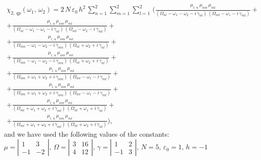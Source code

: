 \documentclass[12pt,twoside,a4paper]{article}
\numberwithin{equation}{subsection}
\numberwithin{figure}{subsection}
\begin{document}
\begin{multline} \label{eq:fht_qp2}
  \chi_{2, \,qp}({\omega_{1}}, \,{\omega_{2}}) = 
     2\,N\,\varepsilon_{0}\,h^{2}\,\sum_{n=1}^{2}\sum_{m=1}^{2}\sum_{l=1}^{2}\,
  ( 
      \frac {{\mu_{l,\,n}}\,{\mu_{nm}}\,{\mu_{ml}}}
      {({\Omega_{nl}} - \omega_1 - \omega_2 - i\,{\gamma_{nl}})\,({\Omega_{ml}} - \omega_1 - i\,{\gamma_{ml}})}
+\\ + \frac   {{\mu_{l, \,n}}\,{\mu_{nm}}\,{\mu_{ml}}}
      {({\Omega_{nl}} - \omega_1 - \omega_1 - i\,{\gamma_{nl}})\,({\Omega_{ml}} - \omega_2 - i\,{\gamma_{ml}})}
+\\ + \frac   {{\mu_{l, \,n}}\,{\mu_{nm}}\,{\mu_{ml}}}
      {({\Omega_{mn}} - \omega_1 - \omega_2 - i\,{\gamma_{mn}})\,({\Omega_{nl}} + \omega_2 + i\,{\gamma_{nl}})}
+\\ + \frac{{\mu_{l, \,n }}\,{\mu_{nm}}\,{\mu_{ml}}} 
      {({\Omega_{mn}} - \omega_1 - \omega_2 - i\,{\gamma_{mn}})\,({\Omega_{nl}} + \omega_2 + i\,{\gamma_{nl}})} 
+\\ + \frac   {{\mu_{l, \,n}}\,{\mu_{nm}}\,{\mu_{ml}}}
      {({\Omega_{nm}} + \omega_1 + \omega_2 + i\,{\gamma_{nm}})\,({\Omega_{ml}} - \omega_1 - i\,{\gamma_{ml}})}
+\\ + \frac {{\mu_{l, \,n}}\,{\mu_{ nm}}\,{\mu_{ml}}}
      {({\Omega_{nm}} + \omega_1 + \omega_2 + i\,{\gamma_{nm}})\,({\Omega_{ml}} - \omega_1 - i\,{\gamma_{ml}})} 
+\\ + \frac {{\mu_{l, \,n}}\,{\mu_{nm}}\,{\mu_{ml}}}
      {({\Omega_{ml}} + \omega_1 + \omega_2 + i\,{\gamma_{ml}})\,({\Omega_{nl}} + \omega_1 + i\,{\gamma_{nl}})}
+\\ + \frac {{\mu_{l, \,n}}\,{\mu_{nm}}\,{\mu_{ml}}}
      {({\Omega_{ml}} + \omega_1 + \omega_2 + i\,{\gamma_{ml}})\,({\Omega_{nl}} + \omega_2 + i\,{\gamma_{nl}})}
  )  ,
\end{multline}
and we have used the following values of the constants: \\
$\mu = \left| \begin{array}{cc} 
    1 & 3 \\ -1 & -2 
  \end{array} \right|,\, 
  \Omega = \left| \begin{array}{cc} 
    3 & 16 \\ 4 & 12 
  \end{array} \right|,\,
  \gamma = \left| \begin{array}{cc} 
  1 & 2 \\ -1 & 3
  \end{array} \right|,\, N=5,\, {\varepsilon_{0}}=1,\,h= - 1$
\end{document}
